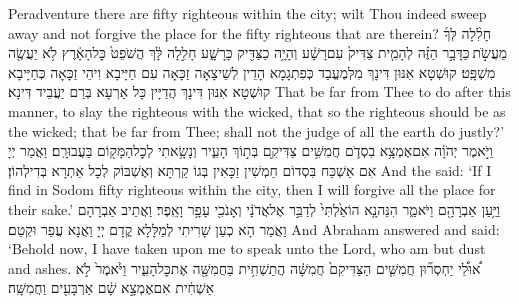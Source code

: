 {Peradventure there are fifty righteous within the city; wilt Thou indeed sweep away and not forgive the place for the fifty righteous that are therein?}{}
{חָלִ֨לָה לְּךָ֜ מֵעֲשֹׂ֣ת \legarmeh  כַּדָּבָ֣ר הַזֶּ֗ה לְהָמִ֤ית צַדִּיק֙ עִם\maqqaf רָשָׁ֔ע וְהָיָ֥ה כַצַּדִּ֖יק כָּרָשָׁ֑ע חָלִ֣לָה לָּ֔ךְ הֲשֹׁפֵט֙ כׇּל\maqqaf הָאָ֔רֶץ לֹ֥א יַעֲשֶׂ֖ה מִשְׁפָּֽט׃}
{קוּשְׁטָא אִנּוּן דִּינָךְ מִלְּמֶעֱבַד כְּפִתְגָמָא הָדֵין לְשֵׁיצָאָה זַכָּאָה עִם חַיָּיבָא וִיהֵי זַכָּאָה כְּחַיָּיבָא קוּשְׁטָא אִנּוּן דִּינָךְ הֲדַיָּין כָּל אַרְעָא בְּרַם יַעֲבֵיד דִּינָא׃}
{That be far from Thee to do after this manner, to slay the righteous with the wicked, that so the righteous should be as the wicked; that be far from Thee; shall not the judge of all the earth do justly?’}{}
{וַיֹּ֣אמֶר יְהֹוָ֔ה אִם\maqqaf אֶמְצָ֥א בִסְדֹ֛ם חֲמִשִּׁ֥ים צַדִּיקִ֖ם בְּת֣וֹךְ הָעִ֑יר וְנָשָׂ֥אתִי לְכׇל\maqqaf הַמָּק֖וֹם בַּעֲבוּרָֽם׃}
{וַאֲמַר יְיָ אִם אַשְׁכַּח בִּסְדוֹם חַמְשִׁין זַכָּאִין בְּגוֹ קַרְתָּא וְאֶשְׁבּוֹק לְכָל אַתְרָא בְּדִילְהוֹן׃}
{And the \lord\space said: ‘If I find in Sodom fifty righteous within the city, then I will forgive all the place for their sake.’}{}
{וַיַּ֥עַן אַבְרָהָ֖ם וַיֹּאמַ֑ר הִנֵּה\maqqaf נָ֤א הוֹאַ֙לְתִּי֙ לְדַבֵּ֣ר אֶל\maqqaf אֲדֹנָ֔י וְאָנֹכִ֖י עָפָ֥ר וָאֵֽפֶר׃}
{וַאֲתֵיב אַבְרָהָם וַאֲמַר הָא כְעַן שָׁרִיתִי לְמַלָּלָא קֳדָם יְיָ וַאֲנָא עֲפַר וּקְטַם׃}
{And Abraham answered and said: ‘Behold now, I have taken upon me to speak unto the Lord, who am but dust and ashes.}{}
{א֠וּלַ֠י יַחְסְר֞וּן חֲמִשִּׁ֤ים הַצַּדִּיקִם֙ חֲמִשָּׁ֔ה הֲתַשְׁחִ֥ית בַּחֲמִשָּׁ֖ה אֶת\maqqaf כׇּל\maqqaf הָעִ֑יר וַיֹּ֙אמֶר֙ לֹ֣א אַשְׁחִ֔ית אִם\maqqaf אֶמְצָ֣א שָׁ֔ם אַרְבָּעִ֖ים וַחֲמִשָּֽׁה׃}
